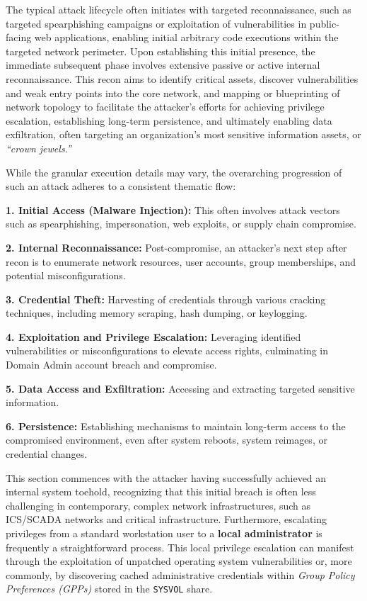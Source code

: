 The typical attack lifecycle often initiates with targeted reconnaissance, such as targeted spearphishing campaigns or exploitation of vulnerabilities in public-facing web applications, enabling initial arbitrary code executions within the targeted network perimeter. Upon establishing this initial presence, the immediate subsequent phase involves extensive passive or active internal reconnaissance. This recon aims to identify critical assets, discover vulnerabilities and weak entry points into the core network, and mapping or blueprinting of network topology to facilitate the attacker’s efforts for achieving privilege escalation, establishing long-term persistence, and ultimately enabling data exfiltration, often targeting an organization’s most sensitive information assets, or \textit{“crown jewels.”}

While the granular execution details may vary, the overarching progression of such an attack adheres to a consistent thematic flow:

\textbf{1. Initial Access (Malware Injection): }This often involves attack vectors such as spearphishing, impersonation, web exploits, or supply chain compromise.

\textbf{2. Internal Reconnaissance: }Post-compromise, an attacker’s next step after recon is to enumerate network resources, user accounts, group memberships, and potential misconfigurations.

\textbf{3. Credential Theft: }Harvesting of credentials through various cracking techniques, including memory scraping, hash dumping, or keylogging.

\textbf{4. Exploitation and Privilege Escalation: }Leveraging identified vulnerabilities or misconfigurations to elevate access rights, culminating in Domain Admin account breach and compromise.

\textbf{5. Data Access and Exfiltration: }Accessing and extracting targeted sensitive information.

\textbf{6. Persistence: }Establishing mechanisms to maintain long-term access to the compromised environment, even after system reboots, system reimages, or credential changes.

This section commences with the attacker having successfully achieved an internal system toehold, recognizing that this initial breach is often less challenging in contemporary, complex network infrastructures, such as ICS/SCADA networks and critical infrastructure. Furthermore, escalating privileges from a standard workstation user to a \textbf{local administrator} is frequently a straightforward process. This local privilege escalation can manifest through the exploitation of unpatched operating system vulnerabilities or, more commonly, by discovering cached administrative credentials within \textit{Group Policy Preferences (GPPs)} stored in the \texttt{SYSVOL} share.

